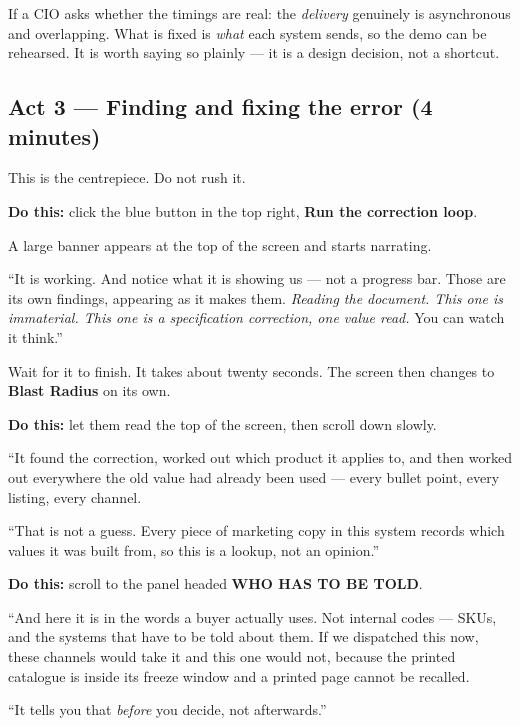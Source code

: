 \documentclass[11pt,a4paper]{article}
\newcommand{\ui}[1]{\textbf{#1}}          %
\begin{document}
\begin{aside}
If a CIO asks whether the timings are real: the \emph{delivery} genuinely is
asynchronous and overlapping. What is fixed is \emph{what} each system sends,
so the demo can be rehearsed. It is worth saying so plainly --- it is a design
decision, not a shortcut.
\end{aside}

\subsection{Act 3 --- Finding and fixing the error (4 minutes)}

This is the centrepiece. Do not rush it.

\textbf{Do this:} click the blue button in the top right, \ui{Run the
correction loop}.

A large banner appears at the top of the screen and starts narrating.

\begin{say}
``It is working. And notice what it is showing us --- not a progress bar.
Those are its own findings, appearing as it makes them. \emph{Reading the
document. This one is immaterial. This one is a specification correction, one
value read.} You can watch it think.''
\end{say}

Wait for it to finish. It takes about twenty seconds. The screen then changes
to \ui{Blast Radius} on its own.

\textbf{Do this:} let them read the top of the screen, then scroll down slowly.

\begin{say}
``It found the correction, worked out which product it applies to, and then
worked out everywhere the old value had already been used --- every bullet
point, every listing, every channel.

``That is not a guess. Every piece of marketing copy in this system records
which values it was built from, so this is a lookup, not an opinion.''
\end{say}

\textbf{Do this:} scroll to the panel headed \ui{WHO HAS TO BE TOLD}.

\begin{say}
``And here it is in the words a buyer actually uses. Not internal codes ---
SKUs, and the systems that have to be told about them. If we dispatched this
now, these channels would take it and this one would not, because the printed
catalogue is inside its freeze window and a printed page cannot be recalled.

``It tells you that \emph{before} you decide, not afterwards.''
\end{say}
\end{document}
